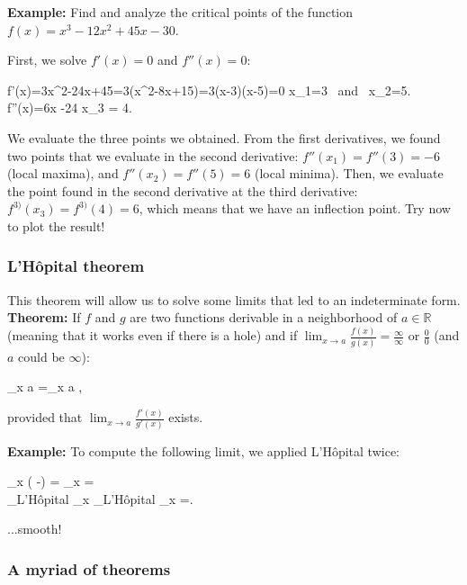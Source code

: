 {\bf Example:} Find and analyze the critical points of the function$f(x)=x^3-12x^2+45x-30$.

First, we solve $f'(x)=0$ and $f''(x)=0$:

\bnn
f'(x)=3x^2-24x+45=3(x^2-8x+15)=3(x-3)(x-5)=0 \quad \rightarrow x_1=3 \mbox{ and } x_2=5.\\
f''(x)=6x -24 \quad \rightarrow x_3 = 4.
\enn

We evaluate the three points we obtained. From the first derivatives, we found
two points that we evaluate in the second derivative: $f''(x_1)=f''(3)=-6$ (local maxima), and $f''(x_2)=f''(5)=6$ (local minima). Then, we evaluate the point
found in the second derivative at the third derivative: $f^{3)}(x_3)=f^{3)}(4)=6$, which means that we have an inflection point. Try now to plot the result!

\subsubsection{L'H{\^o}pital theorem}

This theorem will allow us to solve some limits that led to an indeterminate form. 
{\bf Theorem:} If $f$ and $g$ are two functions derivable in a neighborhood of $a\in \mathbb{R}$ (meaning that it works even if there is a hole) and if $\lim_{x  \rightarrow a} \frac{f(x)}{g(x)}=\frac{\infty}{\infty} \mbox{ or }\frac{0}{0}$ (and $a$ could be $\infty$):

\bnn
	\lim_{x \rightarrow a} =\lim_{x \rightarrow a} ,
\enn

provided that $\lim_{x \rightarrow a} \frac{f'(x)}{g'(x)}$ exists.

{\bf Example:} To compute the following limit, we applied L'H{\^o}pital twice:

\bnn
 \lim_{x }\left(  -\right) =  \lim_{x }  = \\
\underbrace{=}_{\mbox{{\tiny L'H{\^o}pital}}} \lim_{x }\underbrace{=}_{\mbox{{\tiny L'H{\^o}pital}}} \lim_{x }=.
\enn

...smooth!
  
\subsubsection{A myriad of theorems}

